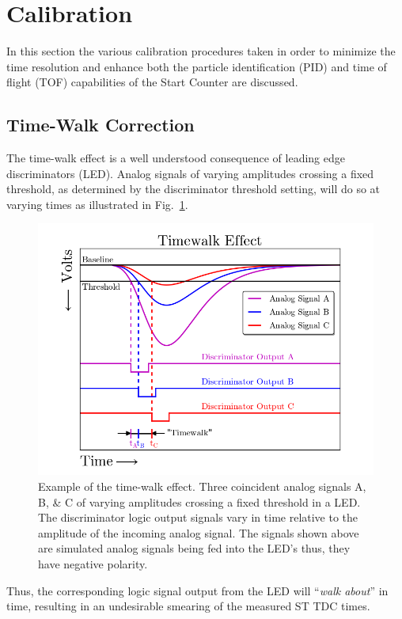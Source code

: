 \section{Calibration} \label{sec:calib}

In this section the various calibration procedures taken in order to minimize the time resolution and enhance both the particle identification (PID) and time of flight (TOF) capabilities of the Start Counter are discussed.

\subsection{Time-Walk Correction} \label{sec:calib_tw}

The time-walk effect is a well understood consequence of leading edge discriminators (LED).  Analog signals of varying amplitudes crossing a fixed threshold, as determined by the discriminator threshold setting, will do so at varying times as illustrated in Fig.~\ref{fig:time_walk_effect}.
	\begin{figure}[!htb]
		\centering
		\includegraphics[width=1.0\columnwidth]{calibration/figs/time_walk_effect}
		\caption{Example of the time-walk effect. Three coincident analog signals A, B, \& C of varying amplitudes crossing a fixed threshold in a LED. The discriminator logic output signals vary in time relative to the amplitude of the incoming analog signal.  The signals shown above are simulated analog signals being fed into the LED's thus, they have negative polarity.}
		\label{fig:time_walk_effect}
	\end{figure}
Thus, the corresponding logic signal output from the LED will ``\textit{walk about}'' in time, resulting in an undesirable smearing of the measured ST TDC times.

